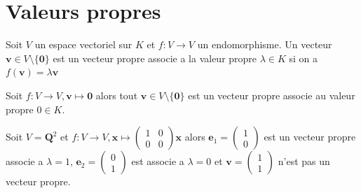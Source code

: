 \chapter{Valeurs propres} 

\begin{definition}
Soit $V$ un espace vectoriel sur $K$ et $f:V\to V$ un endomorphisme. Un vecteur $\boldsymbol{v}\in V\setminus \{ \boldsymbol{0} \}$ est un vecteur propre associe a la valeur propre $\lambda \in K$ si on a $f(\boldsymbol{v})=\lambda \boldsymbol{v}$
\end{definition}

\begin{example}
Soit $f:V\to V,\boldsymbol{v}\mapsto \boldsymbol{0}$ alors tout $\boldsymbol{v}\in V\setminus \{ \boldsymbol{0} \}$ est un vecteur propre associe au valeur propre $0\in K$. 
\end{example}
\begin{example}
Soit $V=\mathbf{Q}^{2}$ et $f:V\to V,\boldsymbol{x}\mapsto \begin{pmatrix}1 & 0 \\ 0 & 0\end{pmatrix}\boldsymbol{x}$ alors $\boldsymbol{e}_{1}=\begin{pmatrix}1  \\ 0\end{pmatrix}$ est un vecteur propre associe a $\lambda=1$, $\boldsymbol{e}_{2}=\begin{pmatrix}0 \\ 1 \end{pmatrix}$ est associe a $\lambda=0$ et $\boldsymbol{v}=\begin{pmatrix}1 \\ 1\end{pmatrix}$ n'est pas un vecteur propre.
\end{example}


